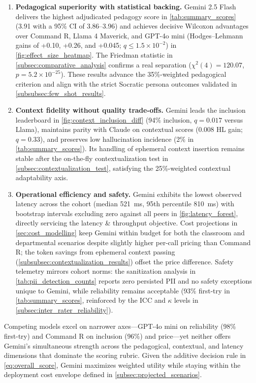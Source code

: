 \begin{enumerate}
	\item \textbf{Pedagogical superiority with statistical backing.} Gemini 2.5 Flash delivers the highest adjudicated pedagogy score in \cref{tab:summary_scores} (3.91 with a 95\% CI of 3.86--3.96) and achieves decisive Wilcoxon advantages over Command R, Llama 4 Maverick, and GPT-4o mini (Hodges--Lehmann gains of +0.10, +0.26, and +0.045; $q\leq 1.5\times10^{-2}$) in \cref{fig:effect_size_heatmap}. The Friedman statistic in \cref{subsec:comparative_analysis} confirms a real separation ($\chi^2(4)=120.07$, $p=5.2\times10^{-25}$). These results advance the 35\%-weighted pedagogical criterion and align with the strict Socratic persona outcomes validated in \cref{subsubsec:few_shot_results}.
	\item \textbf{Context fidelity without quality trade-offs.} Gemini leads the inclusion leaderboard in \cref{fig:context_inclusion_diff} (94\% inclusion, $q=0.017$ versus Llama), maintains parity with Claude on contextual scores (0.008 HL gain; $q=0.33$), and preserves low hallucination incidence (2\% in \cref{tab:summary_scores}). Its handling of ephemeral context insertion remains stable after the on-the-fly contextualization test in \cref{subsec:contextualization_test}, satisfying the 25\%-weighted contextual adaptability axis.
	\item \textbf{Operational efficiency and safety.} Gemini exhibits the lowest observed latency across the cohort (median 521~ms, 95th percentile 810~ms) with bootstrap intervals excluding zero against all peers in \cref{fig:latency_forest}, directly servicing the latency \& throughput objective. Cost projections in \cref{sec:cost_modelling} keep Gemini within budget for both the classroom and departmental scenarios despite slightly higher per-call pricing than Command R; the token savings from ephemeral context passing (\cref{subsubsec:contextualization_results}) offset the price difference. Safety telemetry mirrors cohort norms: the sanitization analysis in \cref{tab:pii_detection_counts} reports zero persisted PII and no safety exceptions unique to Gemini, while reliability remains acceptable (93\% first-try in \cref{tab:summary_scores}, reinforced by the ICC and $\kappa$ levels in \cref{subsec:inter_rater_reliability}).
\end{enumerate}

Competing models excel on narrower axes---GPT-4o mini on reliability (98\% first-try) and Command R on inclusion (96\%) and price---yet neither offers Gemini's simultaneous strength across the pedagogical, contextual, and latency dimensions that dominate the scoring rubric. Given the additive decision rule in \cref{eq:overall_score}, Gemini maximizes weighted utility while staying within the deployment cost envelope defined in \cref{subsec:projected_scenarios}.

